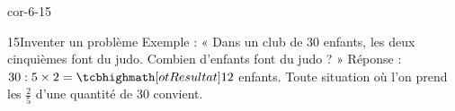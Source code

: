\begin{blocLivre}{cor-6-15}\begin{corrige}{15}{Inventer un problème}
Exemple : « Dans un club de 30 enfants, les deux cinquièmes font du judo. Combien d’enfants font du judo ? » Réponse : $30:5\times2=\res{12}$ enfants. Toute situation où l’on prend les $\frac25$ d’une quantité de 30 convient.
\end{corrige}\end{blocLivre}
